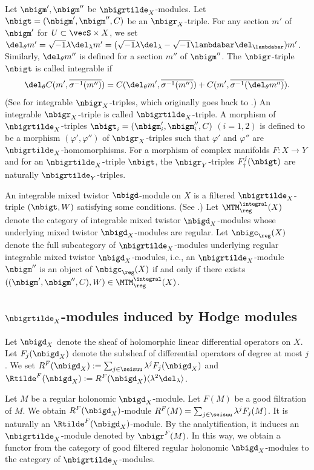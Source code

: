 \documentclass[a4,10pt]{article}
\begin{document}
Let $\nbigm',\nbigm''$ be $\nbigrtilde_X$-modules.
Let $\nbigt=(\nbigm',\nbigm'',C)$
be an $\nbigr_X$-triple.
For any section $m'$ of $\nbigm'$
for $U\subset \vecS\times X$,
we set
$\del_{\theta}m'=\sqrt{-1}\lambda\del_{\lambda}m'
=(\sqrt{-1}\lambda\del_{\lambda}
-\sqrt{-1}\lambdabar\del_{\lambdabar})m'$.
Similarly, $\del_{\theta}m''$ is defined for
a section $m''$ of $\nbigm''$.
The $\nbigr$-triple $\nbigt$ is called integrable
if
\[
 \del_{\theta}C(m',\overline{\sigma^{-1}(m'')})
=C(\del_{\theta}m',\overline{\sigma^{-1}(m'')})
+C(m',\overline{\sigma^{-1}(\del_{\theta}m'')}).
\]
(See \cite[\S2.1.5]{Mochizuki-MTM} for integrable
$\nbigr_X$-triples,
which originally goes back to \cite{Sabbah-pure-twistor}.)
An integrable $\nbigr_X$-triple is called
$\nbigrtilde_X$-triple.
A morphism of $\nbigrtilde_X$-triples
$\nbigt_i=(\nbigm'_i,\nbigm''_i,C)$ $(i=1,2)$
is defined to be a morphism $(\varphi',\varphi'')$
of $\nbigr_X$-triples
such that $\varphi'$ and $\varphi''$
are $\nbigrtilde_X$-homomorphisms.
For a morphism of complex manifolds $F:X\to Y$
and for an $\nbigrtilde_X$-triple $\nbigt$,
the $\nbigr_Y$-triples
$F^j_{\dagger}(\nbigt)$
are naturally $\nbigrtilde_Y$-triples.

An integrable mixed twistor $\nbigd$-module on $X$
is a filtered $\nbigrtilde_X$-triple $(\nbigt,W)$
satisfying some conditions.
(See \cite[\S7.2.3]{Mochizuki-MTM}.)
Let $\MTM_{\reg}^{\integral}(X)$ denote
the category of
integrable mixed twistor $\nbigd_X$-modules
whose underlying mixed twistor $\nbigd_X$-modules are regular.
Let $\nbigc_{\reg}(X)$ denote
the full subcategory of $\nbigrtilde_X$-modules
underlying regular integrable mixed twistor $\nbigd_X$-modules,
i.e.,
an $\nbigrtilde_X$-module $\nbigm''$ is an object of $\nbigc_{\reg}(X)$
if and only if
there exists
$((\nbigm',\nbigm'',C),W)\in\MTM^{\integral}_{\reg}(X)$.


\subsection{$\nbigrtilde_X$-modules induced by Hodge modules}


Let $\nbigd_X$ denote the sheaf of
holomorphic linear differential operators on $X$.
Let $F_j(\nbigd_X)$ denote the subsheaf
of differential operators of degree at most $j$.
We set
$R^F(\nbigd_X):=\sum_{j\in\seisuu} \lambda^jF_j(\nbigd_X)$
and
$\Rtilde^F(\nbigd_X):=
R^F(\nbigd_X)\langle \lambda^2\del_{\lambda}\rangle$.

Let $M$ be a regular holonomic $\nbigd_X$-module.
Let $F(M)$ be a good filtration of $M$.
We obtain $R^F(\nbigd_X)$-module
$R^F(M)=\sum_{j\in\seisuu}\lambda^jF_j(M)$.
It is naturally an $\Rtilde^F(\nbigd_X)$-module.
By the analytification,
it induces an $\nbigrtilde_X$-module
denoted by $\nbigr^F(M)$.
In this way,
we obtain a functor
from the category of good filtered regular holonomic
$\nbigd_X$-modules
to the category of $\nbigrtilde_X$-modules.
\end{document}
